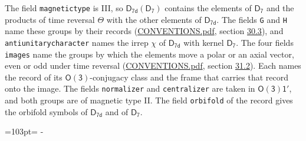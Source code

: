 \documentclass[10pt,a4paper]{article}
\newcommand{\needspace}[1]{\par\penalty-100\begingroup\dimen0=#1\relax\dimen2=\pagegoal
  \advance\dimen2-\pagetotal\ifdim\dimen0>\dimen2\relax\ifdim\dimen2>0pt\vfil\break\fi\fi
  \endgroup}
\numberwithin{equation}{section}
\newcommand{\grp}[1]{\mathsf{#1}}
\begin{document}
The field \texttt{magnetictype} is III, so $\grp{D_{7d}}(\grp{D_{7}})$ contains the elements of $\grp{D_{7}}$ and the products of time reversal $\varTheta$ with the other elements of $\grp{D_{7d}}$. The fields \texttt{G} and \texttt{H} name these groups by their records (\href{../../CONVENTIONS.pdf}{CONVENTIONS.pdf}, section \href{../../CONVENTIONS.pdf\#conv.30.3}{30.3}), and \texttt{antiunitarycharacter} names the irrep $\chi$ of $\grp{D_{7d}}$ with kernel $\grp{D_{7}}$. The four fields \texttt{images} name the groups by which the elements move a polar or an axial vector, even or odd under time reversal (\href{../../CONVENTIONS.pdf}{CONVENTIONS.pdf}, section \href{../../CONVENTIONS.pdf\#conv.31.2}{31.2}). Each names the record of its $\grp{O(3)}$-conjugacy class and the frame that carries that record onto the image. The fields \texttt{normalizer} and \texttt{centralizer} are taken in $\grp{O(3)1'}$, and both groups are of magnetic type II. The field \texttt{orbifold} of the record gives the orbifold symbols of $\grp{D_{7d}}$ and of $\grp{D_{7}}$.
\needspace{103pt}
\end{document}
